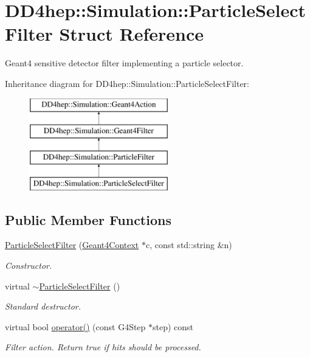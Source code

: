 \hypertarget{struct_d_d4hep_1_1_simulation_1_1_particle_select_filter}{}\section{D\+D4hep\+:\+:Simulation\+:\+:Particle\+Select\+Filter Struct Reference}
\label{struct_d_d4hep_1_1_simulation_1_1_particle_select_filter}


Geant4 sensitive detector filter implementing a particle selector.  


Inheritance diagram for D\+D4hep\+:\+:Simulation\+:\+:Particle\+Select\+Filter\+:\begin{figure}[H]
\begin{center}
\leavevmode
\includegraphics[height=4.000000cm]{struct_d_d4hep_1_1_simulation_1_1_particle_select_filter}
\end{center}
\end{figure}
\subsection*{Public Member Functions}
\begin{DoxyCompactItemize}
\item 
\hyperlink{struct_d_d4hep_1_1_simulation_1_1_particle_select_filter_a02e58fea6995a7e71f4ea2ea3bb4696e}{Particle\+Select\+Filter} (\hyperlink{class_d_d4hep_1_1_simulation_1_1_geant4_context}{Geant4\+Context} $\ast$c, const std\+::string \&n)
\begin{DoxyCompactList}\small\item\em Constructor. \end{DoxyCompactList}\item 
virtual \hyperlink{struct_d_d4hep_1_1_simulation_1_1_particle_select_filter_aee798c7febdef997d9288130d8c08d0f}{$\sim$\+Particle\+Select\+Filter} ()
\begin{DoxyCompactList}\small\item\em Standard destructor. \end{DoxyCompactList}\item 
virtual bool \hyperlink{struct_d_d4hep_1_1_simulation_1_1_particle_select_filter_aa24ab138bc02e2e02a06c4d75db74667}{operator()} (const G4\+Step $\ast$step) const
\begin{DoxyCompactList}\small\item\em Filter action. Return true if hits should be processed. \end{DoxyCompactList}\end{DoxyCompactItemize}
